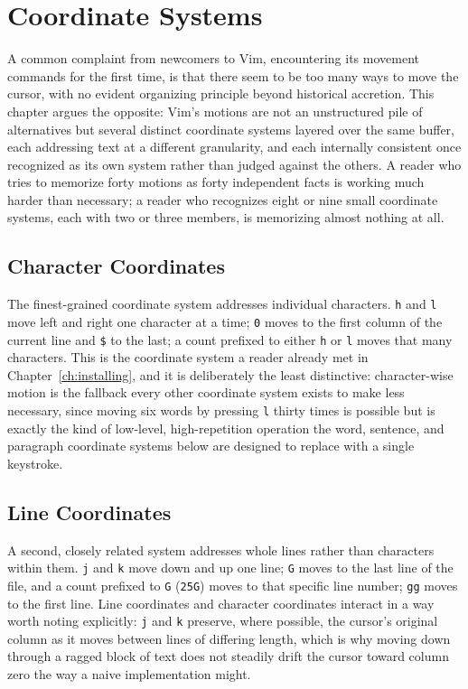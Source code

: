 \chapter{Coordinate Systems}
\label{ch:coordinates}

A common complaint from newcomers to Vim, encountering its movement commands for the first time, is that there seem to be too many ways to move the cursor, with no evident organizing principle beyond historical accretion. This chapter argues the opposite: Vim's motions are not an unstructured pile of alternatives but several distinct coordinate systems layered over the same buffer, each addressing text at a different granularity, and each internally consistent once recognized as its own system rather than judged against the others. A reader who tries to memorize forty motions as forty independent facts is working much harder than necessary; a reader who recognizes eight or nine small coordinate systems, each with two or three members, is memorizing almost nothing at all.

\section{Character Coordinates}

The finest-grained coordinate system addresses individual characters. \texttt{h} and \texttt{l} move left and right one character at a time; \texttt{0} moves to the first column of the current line and \texttt{\$} to the last; a count prefixed to either \texttt{h} or \texttt{l} moves that many characters. This is the coordinate system a reader already met in Chapter~\ref{ch:installing}, and it is deliberately the least distinctive: character-wise motion is the fallback every other coordinate system exists to make less necessary, since moving six words by pressing \texttt{l} thirty times is possible but is exactly the kind of low-level, high-repetition operation the word, sentence, and paragraph coordinate systems below are designed to replace with a single keystroke.

\section{Line Coordinates}

A second, closely related system addresses whole lines rather than characters within them. \texttt{j} and \texttt{k} move down and up one line; \texttt{G} moves to the last line of the file, and a count prefixed to \texttt{G} (\texttt{25G}) moves to that specific line number; \texttt{gg} moves to the first line. Line coordinates and character coordinates interact in a way worth noting explicitly: \texttt{j} and \texttt{k} preserve, where possible, the cursor's original column as it moves between lines of differing length, which is why moving down through a ragged block of text does not steadily drift the cursor toward column zero the way a naive implementation might.

